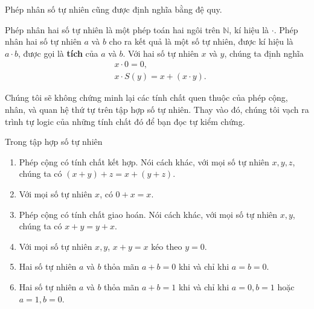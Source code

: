 Phép nhân số tự nhiên cũng được định nghĩa bằng đệ quy.
\begin{definition}
    Phép nhân hai số tự nhiên là một phép toán hai ngôi trên $\mathbb{N}$, kí hiệu là $\cdot$. Phép nhân hai số tự nhiên $a$ và $b$ cho ra kết quả là một số tự nhiên, được kí hiệu là $a\cdot b$, được gọi là \textbf{tích} của $a$ và $b$. Với hai số tự nhiên $x$ và $y$, chúng ta định nghĩa
    \begin{align*}
         & x\cdot 0 = 0,                 \\
         & x\cdot S(y) = x + (x\cdot y).
    \end{align*}
\end{definition}

Chúng tôi sẽ không chứng minh lại các tính chất quen thuộc của phép cộng, nhân, và quan hệ thứ tự trên tập hợp số tự nhiên. Thay vào đó, chúng tôi vạch ra trình tự logic của những tính chất đó để bạn đọc tự kiểm chứng.
\begin{theorem}
    Trong tập hợp số tự nhiên
    \begin{enumerate}[label={(\roman*)}]
        \item Phép cộng có tính chất kết hợp. Nói cách khác, với mọi số tự nhiên $x, y, z$, chúng ta có $(x + y) + z = x + (y + z)$.
        \item Với mọi số tự nhiên $x$, có $0 + x = x$.
        \item Phép cộng có tính chất giao hoán. Nói cách khác, với mọi số tự nhiên $x, y$, chúng ta có $x + y = y + x$.
        \item Với mọi số tự nhiên $x, y$, $x + y = x$ kéo theo $y = 0$.
        \item Hai số tự nhiên $a$ và $b$ thỏa mãn $a + b = 0$ khi và chỉ khi $a = b = 0$.
        \item Hai số tự nhiên $a$ và $b$ thỏa mãn $a + b = 1$ khi và chỉ khi $a = 0, b = 1$ hoặc $a = 1, b = 0$.
    \end{enumerate}
\end{theorem}

